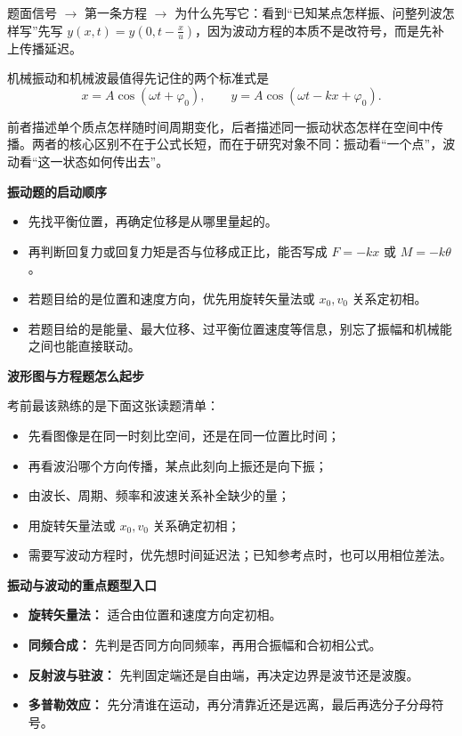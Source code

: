 \documentclass[lang=cn,11pt]{elegantbook}
\newcommand{\bridge}[1]{\begin{note}#1\end{note}}
\begin{document}
\bridge{题面信号 \(\rightarrow\) 第一条方程 \(\rightarrow\) 为什么先写它：看到“已知某点怎样振、问整列波怎样写”先写 \(y(x,t)=y\!\left(0,t-\frac{x}{u}\right)\)，因为波动方程的本质不是改符号，而是先补上传播延迟。}

机械振动和机械波最值得先记住的两个标准式是
\[
x=A\cos(\omega t+\varphi_0),\qquad y=A\cos(\omega t-kx+\varphi_0).
\]

前者描述单个质点怎样随时间周期变化，后者描述同一振动状态怎样在空间中传播。两者的核心区别不在于公式长短，而在于研究对象不同：振动看“一个点”，波动看“这一状态如何传出去”。

\textbf{振动题的启动顺序}

\begin{itemize}
  \item 先找平衡位置，再确定位移是从哪里量起的。
  \item 再判断回复力或回复力矩是否与位移成正比，能否写成 \(F=-kx\) 或 \(M=-k\theta\)。
  \item 若题目给的是位置和速度方向，优先用旋转矢量法或 \(x_0,v_0\) 关系定初相。
  \item 若题目给的是能量、最大位移、过平衡位置速度等信息，别忘了振幅和机械能之间也能直接联动。
\end{itemize}

\textbf{波形图与方程题怎么起步}

考前最该熟练的是下面这张读题清单：
\begin{itemize}
  \item 先看图像是在同一时刻比空间，还是在同一位置比时间；
  \item 再看波沿哪个方向传播，某点此刻向上振还是向下振；
  \item 由波长、周期、频率和波速关系补全缺少的量；
  \item 用旋转矢量法或 \(x_0,v_0\) 关系确定初相；
  \item 需要写波动方程时，优先想时间延迟法；已知参考点时，也可以用相位差法。
\end{itemize}

\textbf{振动与波动的重点题型入口}

\begin{itemize}
  \item \textbf{旋转矢量法：} 适合由位置和速度方向定初相。
  \item \textbf{同频合成：} 先判是否同方向同频率，再用合振幅和合初相公式。
  \item \textbf{反射波与驻波：} 先判固定端还是自由端，再决定边界是波节还是波腹。
  \item \textbf{多普勒效应：} 先分清谁在运动，再分清靠近还是远离，最后再选分子分母符号。
\end{itemize}
\end{document}

